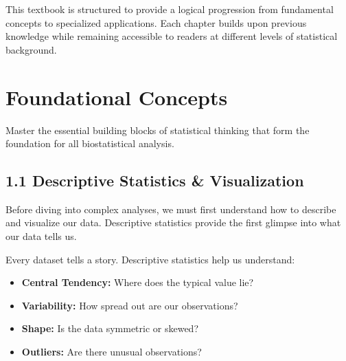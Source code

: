 \documentclass[
  11pt,
  letterpaper,
  oneside]{book}
\providecommand{\tightlist}{%
  \setlength{\itemsep}{0pt}\setlength{\parskip}{0pt}}\usepackage{longtable,booktabs,array}
\begin{document}
This textbook is structured to provide a logical progression from
fundamental concepts to specialized applications. Each chapter builds
upon previous knowledge while remaining accessible to readers at
different levels of statistical background.


\chapter{Foundational Concepts}\label{foundational-concepts}

Master the essential building blocks of statistical thinking that form
the foundation for all biostatistical analysis.

\section{1.1 Descriptive Statistics \&
Visualization}\label{descriptive-statistics-visualization}

Before diving into complex analyses, we must first understand how to
describe and visualize our data. Descriptive statistics provide the
first glimpse into what our data tells us.

\begin{tcolorbox}[enhanced jigsaw, left=2mm, title=\textcolor{quarto-callout-note-color}{\faInfo}\hspace{0.5em}{Understanding Your Data}, toprule=.15mm, toptitle=1mm, arc=.35mm, colframe=quarto-callout-note-color-frame, breakable, coltitle=black, bottomtitle=1mm, bottomrule=.15mm, titlerule=0mm, opacitybacktitle=0.6, colback=white, leftrule=.75mm, rightrule=.15mm, opacityback=0, colbacktitle=quarto-callout-note-color!10!white]

Every dataset tells a story. Descriptive statistics help us understand:

\begin{itemize}
\tightlist
\item
  \textbf{Central Tendency:} Where does the typical value lie?
\item
  \textbf{Variability:} How spread out are our observations?
\item
  \textbf{Shape:} Is the data symmetric or skewed?
\item
  \textbf{Outliers:} Are there unusual observations?
\end{itemize}

\end{tcolorbox}
\end{document}
